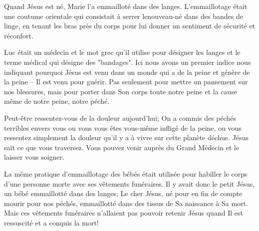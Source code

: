 

Quand Jésus est né, Marie l'a emmailloté dans des langes. L'emmaillotage était une coutume orientale qui consistait à serrer le\linebreak nouveau-né dans des bandes de linge, en tenant les bras près du corps pour lui donner un sentiment de sécurité et réconfort.

Luc était un médecin et le mot grec qu'il utilise pour désigner les langes et le terme médical qui désigne des "bandages". Ici nous avons un premier indice nous indiquant pourquoi Jésus est venu dans un monde qui a de la peine et génère de la peine – Il est venu pour guérir. Pas seulement pour mettre un pansement sur nos blessures, mais pour porter dans Son corps toute notre peine et la cause même de notre peine, notre péché.

Peut-être ressentez-vous de la douleur aujourd'hui; On a commis des péchés terribles envers vous ou vous vous êtes vous-même infligé de la peine, ou vous ressentez simplement la douleur qu'il y a à vivre sur cette planète déchue. Jésus sait ce que vous traversez. Vous pouvez venir auprès du Grand Médecin et le laisser vous soigner.

La même pratique d'emmaillotage des bébés était utilisée pour habiller le corps d'une personne morte avec ses vêtements funéraires. Il y avait donc le petit Jésus, un bébé emmaillotté dans des langes; Le cher Jésus, né pour en fin de compte mourir pour nos péchés, emmaillotté dans des tissus de Sa naissance à Sa mort. Mais ces vêtements funéraires n'allaient pas pouvoir retenir Jésus quand Il est ressuscité et a conquis la mort!


\begin{dvquotes}
\end{dvquotes}
